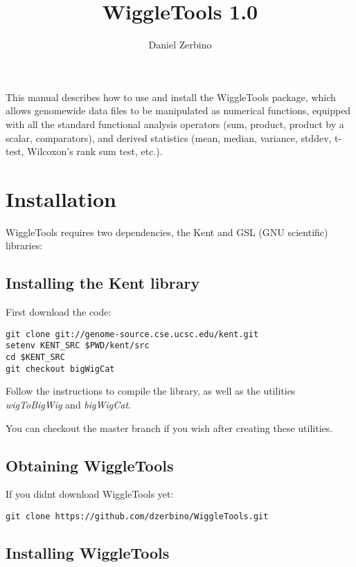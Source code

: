 \documentclass[12pt]{article}
\begin{document}
\title{WiggleTools 1.0}
\author{Daniel Zerbino}
\date{}
\maketitle

This manual describes how to use and install the WiggleTools package, which allows genomewide data files to be manipulated as numerical functions, equipped with all the standard functional analysis operators (sum, product, product by a scalar, comparators), and derived statistics (mean, median, variance, stddev, t-test, Wilcoxon's rank sum test, etc.).

\tableofcontents

\section{Installation}

WiggleTools requires two dependencies, the Kent and GSL (GNU scientific) libraries:

\subsection{Installing the Kent library}

First download the code:

\begin{verbatim}
git clone git://genome-source.cse.ucsc.edu/kent.git
setenv KENT_SRC $PWD/kent/src
cd $KENT_SRC
git checkout bigWigCat
\end{verbatim}

Follow the instructions to compile the library, as well as the utilities \emph{wigToBigWig} and \emph{bigWigCat}.

You can checkout the master branch if you wish after creating these utilities. 

\subsection{Obtaining WiggleTools}

If you didnt download WiggleTools yet:

\begin{verbatim}
git clone https://github.com/dzerbino/WiggleTools.git
\end{verbatim}

\subsection{Installing WiggleTools}
\end{document}
